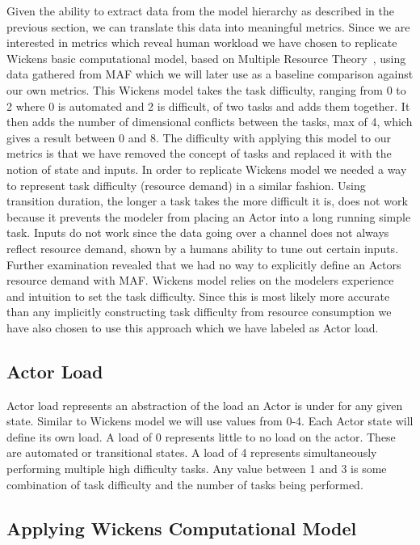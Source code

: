 Given the ability to extract data from the model hierarchy as described in the previous section, we can translate this data into meaningful metrics.  Since we are interested in metrics which reveal human workload we have chosen to replicate Wickens basic computational model, based on Multiple Resource Theory~\cite{wickens2002multiple}, using data gathered from MAF which we will later use as a baseline comparison against our own metrics.  This Wickens model takes the task difficulty, ranging from 0 to 2 where 0 is automated and 2 is difficult, of two tasks and adds them together.  It then adds the number of dimensional conflicts between the tasks, max of 4, which gives a result between 0 and 8.
	The difficulty with applying this model to our metrics is that we have removed the concept of tasks and replaced it with the notion of state and inputs.  In order to replicate Wickens model we needed a way to represent task difficulty (resource demand) in a similar fashion.  Using transition duration, the longer a task takes the more difficult it is, does not work because it prevents the modeler from placing an Actor into a long running simple task.  Inputs do not work since the data going over a channel does not always reflect resource demand, shown by a humans ability to tune out certain inputs.  Further examination revealed that we had no way to explicitly define an Actors resource demand with MAF.  Wickens model relies on the modelers experience and intuition to set the task difficulty.  Since this is most likely more accurate than any implicitly constructing task difficulty from resource consumption we have also chosen to use this approach which we have labeled as Actor load.
	
\subsection{Actor Load}
Actor load represents an abstraction of the load an Actor is under for any given state.  Similar to Wickens model we will use values from 0-4.  Each Actor state will define its own load.  A load of 0 represents little to no load on the actor.  These are automated or transitional states.  A load of 4 represents simultaneously performing multiple high difficulty tasks.  Any value between 1 and 3 is some combination of task difficulty and the number of tasks being performed.

\subsection{Applying Wickens Computational Model}

